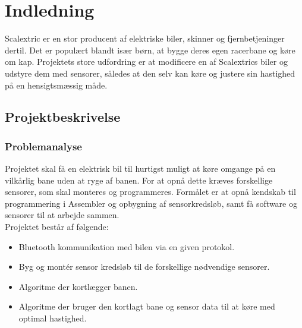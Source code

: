 \newpage

\tableofcontents
\listoftodos



\newpage
\section{Indledning}
Scalextric er en stor producent af elektriske biler, skinner og fjernbetjeninger dertil. Det er populært blandt især børn, at bygge deres egen racerbane og køre om kap. Projektets store udfordring er at modificere en af Scalextrics biler og udstyre dem med sensorer, således at den selv kan køre og justere sin hastighed på en hensigtsmæssig måde.

\subsection{Projektbeskrivelse}
\subsubsection{Problemanalyse}
\label{problemanalyse}
Projektet skal få en elektrisk bil til hurtigst muligt at køre omgange på en vilkårlig bane uden at ryge af banen. For at opnå dette kræves forskellige sensorer, som skal monteres og programmeres. Formålet er at opnå kendskab til programmering i Assembler og opbygning af sensorkredsløb, samt få software og sensorer til at arbejde sammen.  \\
Projektet består af følgende: \\

\begin{itemize}
\item Bluetooth kommunikation med bilen via en given protokol.
\item Byg og montér sensor kredsløb til de forskellige nødvendige sensorer.
\item Algoritme der kortlægger banen.
\item Algoritme der bruger den kortlagt bane og sensor data til at køre med optimal hastighed.
\end{itemize}


